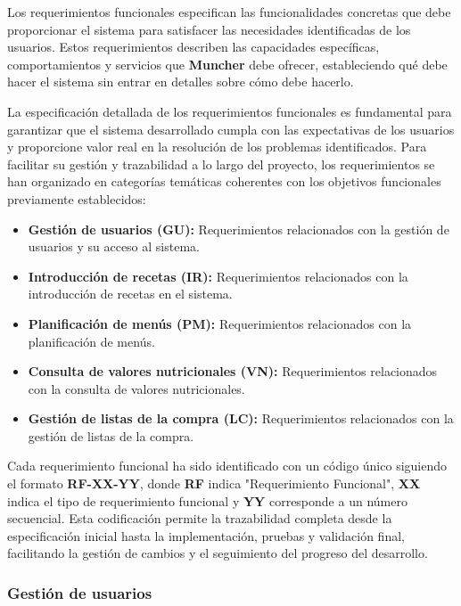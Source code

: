 Los requerimientos funcionales especifican las funcionalidades concretas que debe proporcionar el sistema para satisfacer las necesidades identificadas de los usuarios. Estos requerimientos describen las capacidades específicas, comportamientos y servicios que \textbf{Muncher} debe ofrecer, estableciendo qué debe hacer el sistema sin entrar en detalles sobre cómo debe hacerlo.

La especificación detallada de los requerimientos funcionales es fundamental para garantizar que el sistema desarrollado cumpla con las expectativas de los usuarios y proporcione valor real en la resolución de los problemas identificados. Para facilitar su gestión y trazabilidad a lo largo del proyecto, los requerimientos se han organizado en categorías temáticas coherentes con los objetivos funcionales previamente establecidos:

\begin{itemize}
    \item \textbf{Gestión de usuarios (GU):} Requerimientos relacionados con la gestión de usuarios y su acceso al sistema.
    \item \textbf{Introducción de recetas (IR):} Requerimientos relacionados con la introducción de recetas en el sistema.
    \item \textbf{Planificación de menús (PM):} Requerimientos relacionados con la planificación de menús.
    \item \textbf{Consulta de valores nutricionales (VN):} Requerimientos relacionados con la consulta de valores nutricionales.
    \item \textbf{Gestión de listas de la compra (LC):} Requerimientos relacionados con la gestión de listas de la compra.
\end{itemize}

Cada requerimiento funcional ha sido identificado con un código único siguiendo el formato \textbf{RF-XX-YY}, donde \textbf{RF} indica "Requerimiento Funcional", \textbf{XX} indica el tipo de requerimiento funcional y \textbf{YY} corresponde a un número secuencial. Esta codificación permite la trazabilidad completa desde la especificación inicial hasta la implementación, pruebas y validación final, facilitando la gestión de cambios y el seguimiento del progreso del desarrollo.



\subsubsection*{Gestión de usuarios}

